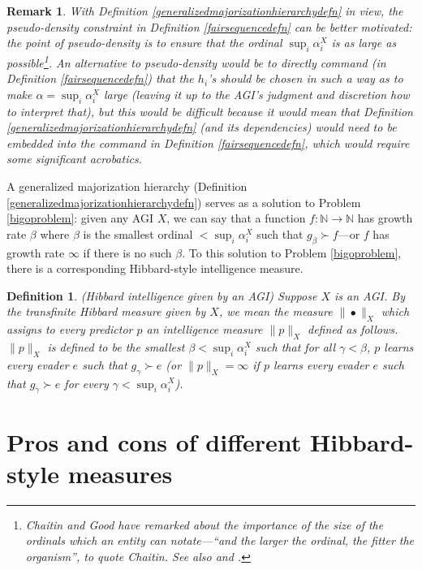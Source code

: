 \documentclass{article}
\newtheorem{definition}[theorem]{Definition}
\newtheorem{remark}[theorem]{Remark}
\begin{document}
\begin{remark}
\label{pseudodensityremark}
With Definition \ref{generalizedmajorizationhierarchydefn} in view,
the pseudo-density
constraint in Definition \ref{fairsequencedefn} can be better motivated:
the point of pseudo-density is to ensure that the ordinal
$\sup_i \alpha^X_i$ is as large as possible\footnote{Chaitin \cite{chaitin}
and Good \cite{good1969godel} have remarked
about the importance of the size of the ordinals which an entity can notate---``and
the larger the ordinal,
the fitter the organism'', to quote Chaitin. See also \cite{ioi1} and \cite{ioi2}.}. An
alternative to pseudo-density would
be to directly command (in Definition \ref{fairsequencedefn}) that the $h_i$'s should
be chosen in such a way as to make $\alpha=\sup_i\alpha^X_i$ large (leaving it up
to the AGI's judgment and discretion how to interpret that), but this would be
difficult because it would mean that Definition \ref{generalizedmajorizationhierarchydefn}
(and its dependencies) would need to be embedded into the command in
Definition \ref{fairsequencedefn}, which would require some significant acrobatics.
\end{remark}

A generalized majorization hierarchy (Definition \ref{generalizedmajorizationhierarchydefn})
serves as a solution to Problem \ref{bigoproblem}: given any AGI $X$, we can say
that a function $f:\mathbb N\to\mathbb N$ has growth rate
$\beta$ where $\beta$ is the smallest ordinal $<\sup_i \alpha^X_i$
such that $g_\beta\succ f$---or $f$ has growth rate $\infty$ if there is no
such $\beta$. To this solution to Problem \ref{bigoproblem}, there is a corresponding
Hibbard-style intelligence measure.

\begin{definition}
    (Hibbard intelligence given by an AGI)
    Suppose $X$ is an AGI. By the \emph{transfinite Hibbard measure given by $X$},
    we mean the measure $\|\bullet\|_X$ which assigns to every predictor $p$ an
    intelligence measure $\|p\|_X$ defined as follows.
    $\|p\|_X$ is defined to be the smallest $\beta<\sup_i\alpha^X_i$
    such that for all $\gamma<\beta$,
    $p$ learns every evader $e$ such that $g_\gamma\succ e$
    (or $\|p\|_X=\infty$ if
    $p$ learns every evader $e$ such that $g_\gamma\succ e$ for every
    $\gamma<\sup_i \alpha^X_i$).
\end{definition}


\section{Pros and cons of different Hibbard-style measures}
\label{prosandconssection}
\end{document}
